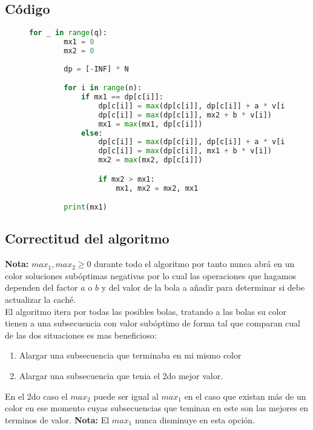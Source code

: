 \documentclass{article}
\begin{document}
\subsection{Código}

\begin{figure}[H]
    \centering
    \begin{lstlisting}[language=Python]
        for _ in range(q):
        mx1 = 0
        mx2 = 0
        
        dp = [-INF] * N  

        for i in range(n):
            if mx1 == dp[c[i]]:
                dp[c[i]] = max(dp[c[i]], dp[c[i]] + a * v[i])
                dp[c[i]] = max(dp[c[i]], mx2 + b * v[i])
                mx1 = max(mx1, dp[c[i]])
            else:
                dp[c[i]] = max(dp[c[i]], dp[c[i]] + a * v[i])
                dp[c[i]] = max(dp[c[i]], mx1 + b * v[i])
                mx2 = max(mx2, dp[c[i]])

                if mx2 > mx1:
                    mx1, mx2 = mx2, mx1

        print(mx1)
    \end{lstlisting}
\end{figure}

\subsection{Correctitud del algoritmo}
\textbf{Nota:}
$max_1, max_2 \geq 0$ durante todo el algoritmo por tanto nunca abrá en un color soluciones subóptimas negativas 
por lo cual las operaciones que hagamos dependen del factor $a$ o $b$ y del valor de la bola a añadir para determinar 
si debe actualizar la caché.
\\
El algoritmo itera por todas las posibles bolas, tratando a las bolas su color tienen a una subsecuencia con valor 
subóptimo de forma tal que comparan cual de las dos situaciones es mas beneficioso:
\begin{enumerate}
    \item Alargar una subsecuencia que terminaba en mi mismo color
    \item Alargar una subsecuencia que tenia el 2do mejor valor.
\end{enumerate}
 En el 2do caso el $max_2 $ puede ser igual al $max_ 1$ en el caso que existan más de un color en ese momento cuyas
 subsecuencias que teminan en este son las mejores en terminos de valor.
\textbf{Nota:} El $max_1$ nunca disminuye en esta opción.
\end{document}
